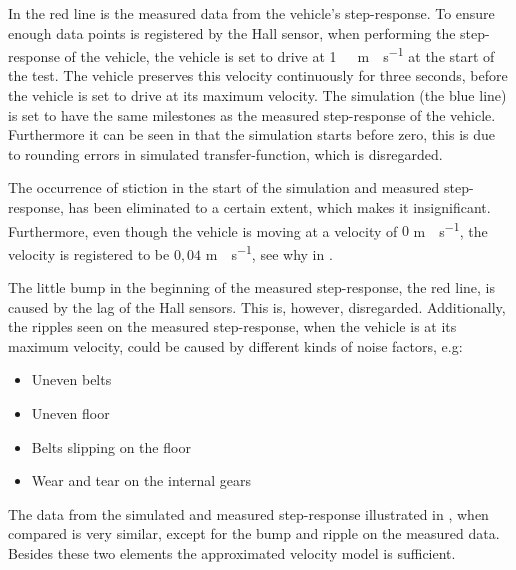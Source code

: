 %
In  the red line is the measured data from the vehicle's step-response. To ensure enough data points is registered by the Hall sensor, when performing the step-response of the vehicle, the vehicle is set to drive at \si{1\ m\cdot s^{-1}} at the start of the test. The vehicle preserves this velocity continuously for three seconds, before the vehicle is set to drive at its maximum velocity. The simulation (the blue line) is set to have the same milestones as the measured step-response of the vehicle. Furthermore it can be seen in  that the simulation starts before zero, this is due to rounding errors in simulated transfer-function, which is disregarded.

The occurrence of stiction in the start of the simulation and measured step-response, has been eliminated to a certain extent, which makes it insignificant. Furthermore, even though the vehicle is moving at a velocity of $0$ \si{m \cdot s^{-1}}, the velocity is registered to be $0,04$ \si{m \cdot s^{-1}}, see why in . 

The little bump in the beginning of the measured step-response, the red line, is caused by the lag of the Hall sensors. This is, however, disregarded. Additionally, the ripples seen on the measured step-response, when the vehicle is at its maximum velocity, could be caused by different kinds of noise factors, e.g:

\begin{itemize}
\item Uneven belts
\item Uneven floor
\item Belts slipping on the floor
\item Wear and tear on the internal gears
\end{itemize}

The data from the simulated and measured step-response illustrated in , when compared is very similar, except for the bump and ripple on the measured data. Besides these two elements the approximated velocity model is sufficient.
